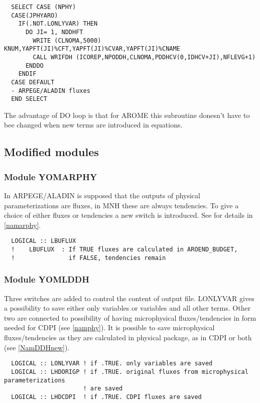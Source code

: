     \begin{verbatim}
  SELECT CASE (NPHY)
  CASE(JPHYARO)
    IF(.NOT.LONLYVAR) THEN
      DO JI= 1, NDDHFT
        WRITE (CLNOMA,5000) KNUM,YAPFT(JI)%CFT,YAPFT(JI)%CVAR,YAPFT(JI)%CNAME
        CALL WRIFDH (ICOREP,NPODDH,CLNOMA,PDDHCV(0,IDHCV+JI),NFLEVG+1)
      ENDDO
    ENDIF
  CASE DEFAULT
  - ARPEGE/ALADIN fluxes
  END SELECT
    \end{verbatim}
The advantage of DO loop is that for AROME this subroutine donesn't have to bee changed when new terms are introduced in equations.

  \subsection{Modified modules}

\subsubsection{Module YOMARPHY}
In ARPEGE/ALADIN is supposed that the outputs of physical parameterizations are fluxes, in MNH these are always tendencies. To give a choice of either fluxes or tendencies a new switch is introduced.
See for details in \ref{namarphy}.
    \begin{verbatim}
  LOGICAL :: LBUFLUX
  !    LBUFLUX  : If TRUE fluxes are calculated in AROEND_BUDGET,
  !               if FALSE, tendencies remain 
    \end{verbatim}

\subsubsection{Module YOMLDDH}
Three switches are added to control the content of output file. LONLYVAR gives a possibility to save either only variables or variables and all other terms. Other two are connected to possibility of having microphysical fluxes/tendencies in form needed for CDPI (see \ref{namphy}). It is possible to save microphysical fluxes/tendencies as they are calculated in physical package, as in CDPI or both (see \ref{NamDDHnew}).

    \begin{verbatim}
  LOGICAL :: LONLYVAR ! if .TRUE. only variables are saved 
  LOGICAL :: LHDORIGP ! if .TRUE. original fluxes from microphysical parameterizations 
                      ! are saved
  LOGICAL :: LHDCDPI  ! if .TRUE. CDPI fluxes are saved
    \end{verbatim}

